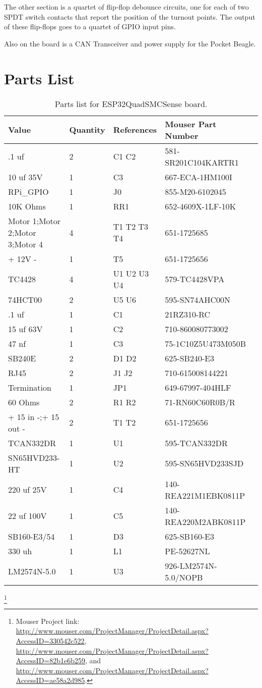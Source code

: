 The other section is a quartet of flip-flop debounce circuits, one for each
of two SPDT switch contacts that report the position of the turnout points.
The output of these flip-flops goes to a quartet of GPIO input pins.

Also on the board is a CAN Transceiver and power supply for the Pocket Beagle.

\section{Parts List}

\begin{table}[htp]
\begin{centering}\begin{tabular}{|l|l|p{1in}|l|p{.5in}|}
\hline
Value&Quantity&References&Mouser Part Number \\
\hline
.1 uf&2&C1 C2&581-SR201C104KARTR1 \\
\hline
10 uf 35V&1&C3&667-ECA-1HM100I \\
\hline
RPi\_GPIO&1&J0&855-M20-6102045 \\
\hline
10K Ohms&1&RR1&652-4609X-1LF-10K \\
\hline
Motor 1;Motor 2;Motor 3;Motor 4&4&T1 T2 T3 T4&651-1725685 \\
\hline
+ 12V -&1&T5&651-1725656 \\
\hline
TC4428&4&U1 U2 U3 U4&579-TC4428VPA \\
\hline
74HCT00&2&U5 U6&595-SN74AHC00N \\
\hline
.1 uf&1&C1&21RZ310-RC\\
\hline
15 uf 63V&1&C2&710-860080773002\\
\hline
47 nf&1&C3&75-1C10Z5U473M050B\\
\hline
SB240E&2&D1 D2&625-SB240-E3\\
\hline
RJ45&2&J1 J2&710-615008144221\\
\hline
Termination&1&JP1&649-67997-404HLF\\
\hline
60 Ohms&2&R1 R2&71-RN60C60R0B/R\\
\hline
+ 15 in -;+ 15 out -&2&T1 T2&651-1725656\\
\hline
TCAN332DR&1&U1&595-TCAN332DR\\
\hline
SN65HVD233-HT&1&U2&595-SN65HVD233SJD\\
\hline
220 uf 25V&1&C4&140-REA221M1EBK0811P\\
\hline
22 uf 100V&1&C5&140-REA220M2ABK0811P\\
\hline
SB160-E3/54&1&D3&625-SB160-E3\\
\hline
330 uh&1&L1&PE-52627NL\\
\hline
LM2574N-5.0&1&U3&926-LM2574N-5.0/NOPB\\
\hline
\end{tabular}
\caption{Parts list for ESP32QuadSMCSense board.}
\end{centering}\end{table}\footnote{Mouser Project link: 
\url{http://www.mouser.com/ProjectManager/ProjectDetail.aspx?AccessID=330542c522},
\url{http://www.mouser.com/ProjectManager/ProjectDetail.aspx?AccessID=82b1e6b259}, and
\url{http://www.mouser.com/ProjectManager/ProjectDetail.aspx?AccessID=ae58a2d985}.}


